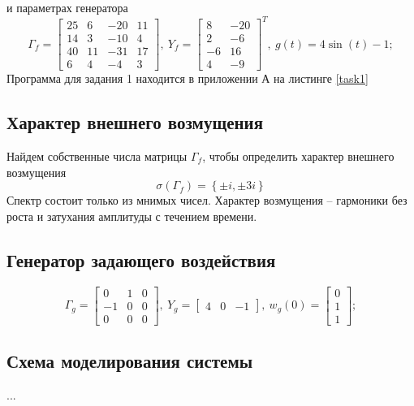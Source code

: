 \documentclass[a4paper, 12pt]{article}
\begin{document}
    и параметрах генератора
    $$
    \Gamma_f=\begin{bmatrix}
        25 &6 &-20 &11\\
        14 &3 &-10 &4\\
        40 &11 &-31 &17\\
        6 &4 &-4 &3
    \end{bmatrix},\ Y_f=\begin{bmatrix}
        8 &-20\\
        2 &-6\\
        -6 &16\\
        4 &-9
    \end{bmatrix}^T,\ g(t)=4\sin\left( t \right)-1;
    $$
    Программа для задания 1 находится в приложении А на листинге \ref{task1}


    \subsection{Характер внешнего возмущения}
    Найдем собственные числа матрицы $\Gamma_f$,
    чтобы определить характер внешнего возмущения
    $$
    \sigma\left( \Gamma_f \right)=\left\{ \pm i,\pm3i \right\}
    $$
    Спектр состоит только из мнимых чисел. Характер возмущения --
    гармоники без роста и затухания амплитуды с течением времени.


    \subsection{Генератор задающего воздействия}
    $$
    \Gamma_g=\begin{bmatrix}
        0 &1 &0\\
        -1 &0 &0\\
        0 &0 &0
    \end{bmatrix},\ Y_g=\begin{bmatrix}
        4 &0 &-1
    \end{bmatrix},\ w_g(0)=\begin{bmatrix}
        0\\1\\1
    \end{bmatrix};
    $$


    \subsection{Схема моделирования системы}
    ...
\end{document}
